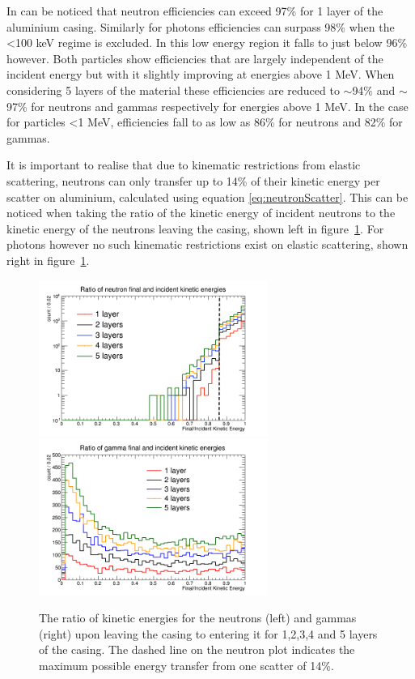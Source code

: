 In can be noticed that neutron efficiencies can exceed 97\% for 1 layer of the aluminium casing. Similarly for photons efficiencies can surpass 98\% when the <100 keV regime is excluded. In this low energy region it falls to just below 96\% however. Both particles show efficiencies that are largely independent of the incident energy but with it slightly improving at energies above 1 MeV. When considering 5 layers of the material these efficiencies are reduced to $\sim$94\% and $\sim$97\% for neutrons and gammas respectively for energies above 1 MeV. In the case for particles <1 MeV, efficiencies fall to as low as 86\% for neutrons and 82\% for gammas.

It is important to realise that due to kinematic restrictions from elastic scattering, neutrons can only transfer up to 14\% of their kinetic energy per scatter on aluminium, calculated using equation \ref{eq:neutronScatter}. This can be noticed when taking the ratio of the kinetic energy of incident neutrons to the kinetic energy of the neutrons leaving the casing, shown left in figure~\ref{fig:energyRatio}. For photons however no such kinematic restrictions exist on elastic scattering, shown right in figure~\ref{fig:energyRatio}.

\begin{figure}[htbp]
\begin{center}
\includegraphics[width=75mm]{Chapter6/figures/neutronAlLayersEnergyRatio.png}
\includegraphics[width=75mm]{Chapter6/figures/gammaAlLayersEnergyRatio.png}
\caption{The ratio of kinetic energies for the neutrons (left) and gammas (right) upon leaving the casing to entering it for 1,2,3,4 and 5 layers of the casing. The dashed line on the neutron plot indicates the maximum possible energy transfer from one scatter of 14\%.}
\label{fig:energyRatio}
\end{center}
\end{figure}

